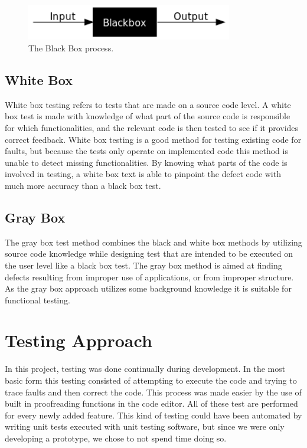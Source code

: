 \begin{figure}[ht!]
\centering
\includegraphics[width=90mm]{./Testing/img/BlackBoxTesting.png}
\caption{The Black Box process. \label{TestBB}}
\end{figure}

\subsection{White Box}
\label{subsec:TestingMethodsWhite}
White box testing refers to tests that are made on a source code level. A white box test is made with knowledge of what part of the source code is responsible for which functionalities, and the relevant code is then tested to see if it provides correct feedback. White box testing is a good method for testing existing code for faults, but because the tests only operate on implemented code this method is unable to detect missing functionalities. By knowing what parts of the code is involved in testing, a white box text is able to pinpoint the defect code with much more accuracy than a black box test. \cite{article:forms-of-software-testing,website:white-box-testing}

\subsection{Gray Box}
\label{subsec:TestingMethodsGray}
The gray box test method combines the black and white box methods by utilizing source code knowledge while designing test that are intended to be executed on the user level like a black box test. The gray box method is aimed at finding defects resulting from improper use of applications, or from improper structure. As the gray box approach utilizes some background knowledge it is suitable for functional testing. \cite{inproc:gray-box}

\section{Testing Approach}
\label{sec:TestingApproach}

In this project, testing was done continually during development. In the most basic form this testing consisted of attempting to execute the code and trying to trace faults and then correct the code. This process was made easier by the use of built in proofreading functions in the code editor. All of these test are performed for every newly added feature. This kind of testing could have been automated by writing unit tests executed with unit testing software, but since we were only developing a prototype, we chose to not spend time doing so.

